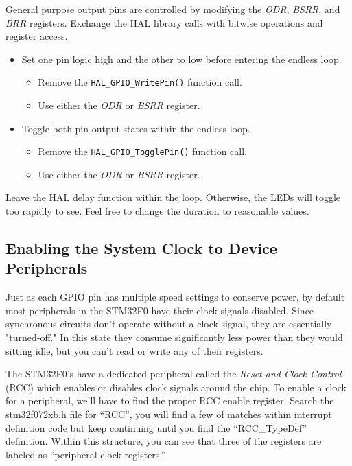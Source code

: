 \documentclass[11pt,fleqn]{book} %
\begin{document}
\begin{exercise} 
    \label{ex4}
     General purpose output pins are controlled by modifying the \textit{ODR}, \textit{BSRR}, and \textit{BRR} registers. Exchange the HAL library calls with bitwise operations and register access.
    \begin{itemize}
        \item Set one pin logic high and the other to low before entering the endless loop.
        \begin{itemize}
            \item Remove the \texttt{HAL\_GPIO\_WritePin()} function call.
            \item Use either the \textit{ODR} or \textit{BSRR} register.  
        \end{itemize}
        \item Toggle both pin output states within the endless loop.
        \begin{itemize}
            \item Remove the \texttt{HAL\_GPIO\_TogglePin()} function call.
            \item Use either the \textit{ODR} or \textit{BSRR} register. 
        \end{itemize}
    \end{itemize}

    \noindent Leave the HAL delay function within the loop. Otherwise, the LEDs will toggle too rapidly to see. Feel free to change the duration to reasonable values.
\end{exercise}
\subsection{Enabling the System Clock to Device Peripherals}

Just as each GPIO pin has multiple speed settings to conserve power, by default most peripherals in the STM32F0 have their clock signals disabled. Since synchronous circuits don't operate without a clock signal, they are essentially "turned-off." In this state they consume significantly less power than they would sitting idle, but you can't read or write any of their registers.

The STM32F0's have a dedicated peripheral called the \textit{Reset and Clock Control} (RCC) which enables or disables clock signals around the chip. To enable a clock for a peripheral, we'll have to find the proper RCC enable register. Search the stm32f072xb.h file for ``RCC'', you will find a few of matches within interrupt definition code but keep continuing until you find the ``RCC\_TypeDef'' definition. Within this structure, you can see that three of the registers are labeled as ``peripheral clock registers.''
\end{document}
